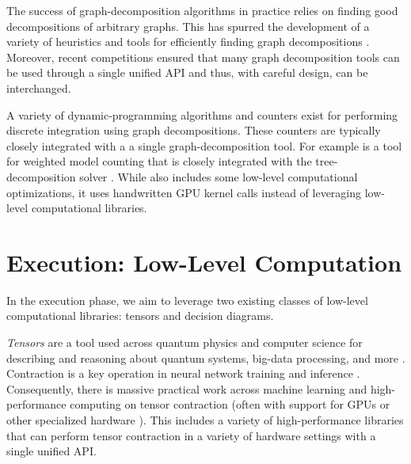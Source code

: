 The success of graph-decomposition algorithms in practice relies on finding good decompositions of arbitrary graphs.
This has spurred the development of a variety of heuristics and tools for efficiently finding graph decompositions \cite{AMW17,HS18,Tamaki17,hicks02}. 
Moreover, recent competitions \cite{DKTW18} ensured that many graph decomposition tools can be used through a single unified API and thus, with careful design, can be interchanged.

A variety of dynamic-programming algorithms \cite{FMR08,SS10} and counters \cite{CW16,FHMW17,FHWZ18,FHZ19} exist for performing discrete integration using graph decompositions.
These counters are typically closely integrated with a a single graph-decomposition tool.
For example  \cite{FHWZ18,FHZ19} is a tool for weighted model counting that is closely integrated with the tree-decomposition solver  \cite{AMW17}. While  also includes some low-level computational optimizations, it uses handwritten GPU kernel calls instead of leveraging low-level computational libraries.


\section{Execution: Low-Level Computation}
\label{sec:intro:execution}
In the execution phase, we aim to leverage two existing classes of low-level computational libraries: tensors and decision diagrams. 

\emph{Tensors} are a tool used across quantum physics and computer science for describing and reasoning about quantum systems, big-data processing, and more \cite{BB17,Cichocki14,Orus19}.
Contraction is a key operation in neural network training and inference \cite{BK07,Hirata03,KKCLA17,VZTGDMVAC18}.
Consequently, there is massive practical work across machine learning and high-performance computing on tensor contraction \cite{BK07,Hirata03,KKCLA17,VZTGDMVAC18} (often with support for GPUs \cite{KSTKPPRS19,NRBHHJN15} or other specialized hardware \cite{JYPPABBBBB17}).
This includes a variety of high-performance libraries that can perform tensor contraction \cite{numpy,ABCCDDDGII16,PGMLJGKLGA19} in a variety of hardware settings with a single unified API. 

